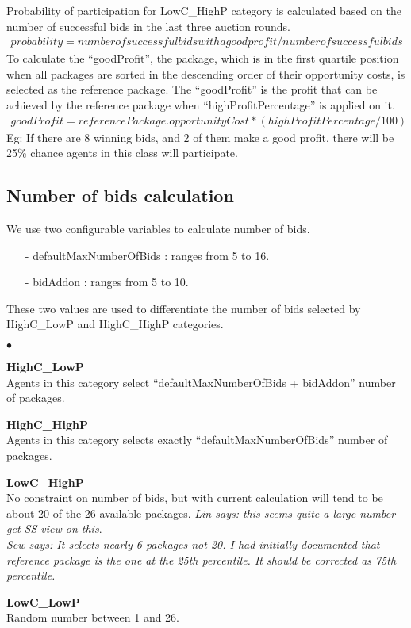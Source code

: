 \documentclass{article} %
\newenvironment{tightitemize}{
                \begin{list}{$\bullet$}{
                    \setlength{\itemsep}{-1pt}}{\setlength{\topsep}{0pt}}}{
                \end{list}}
\begin{document}
Probability of participation for LowC\_HighP category is calculated based 
on the number of successful bids in the last three auction rounds.
\begin{equation}\label{xx}
\begin{split}
probability = number of successful bids with a good profit/number of successful bids
\end{split}
\end{equation}
To calculate the \enquote{goodProfit}, the package, which is in the first quartile position
when all packages are sorted in the descending order of their opportunity
costs, is selected as the reference package. The \enquote{goodProfit} is the profit that 
can be achieved by the reference package when \enquote{highProfitPercentage} is applied on it.
\begin{equation}\label{xx}
\begin{split}
goodProfit = referencePackage.opportunityCost*(highProfitPercentage / 100)
\end{split}
\end{equation}
Eg: If there are 8 winning bids, and 2 of them make a good profit, there will be 25\% 
chance agents in this class will participate.

\subsection{Number of bids calculation}
We use two configurable variables to calculate number of bids.
\begin{itemize}
\item[-] defaultMaxNumberOfBids : ranges from 5 to 16.
\item[-] bidAddon : ranges from 5 to 10.
\end{itemize}
These two values are used to differentiate the number of bids 
selected by HighC\_LowP and HighC\_HighP categories.

\begin{tightitemize}
\item {\bf HighC\_LowP}\\ %
Agents in this category select \enquote{defaultMaxNumberOfBids + 
bidAddon} number of packages.
\item {\bf HighC\_HighP}\\ %
Agents in this category selects exactly 
\enquote{defaultMaxNumberOfBids} number of packages.
\item {\bf LowC\_HighP}\\  %
No constraint on number of bids, but with current calculation will
tend to be about 20 of the 26 available packages.  \textit{Lin says:
  this seems quite a large number - get SS view on this}.
\textit{\\Sew says: It selects nearly 6 packages not 20.  
I had initially documented that reference package is the one at 
the 25th percentile. It should be corrected as 75th percentile.} 
\item {\bf LowC\_LowP}\\ %
Random number between 1 and 26.

\end{tightitemize}
\end{document}
